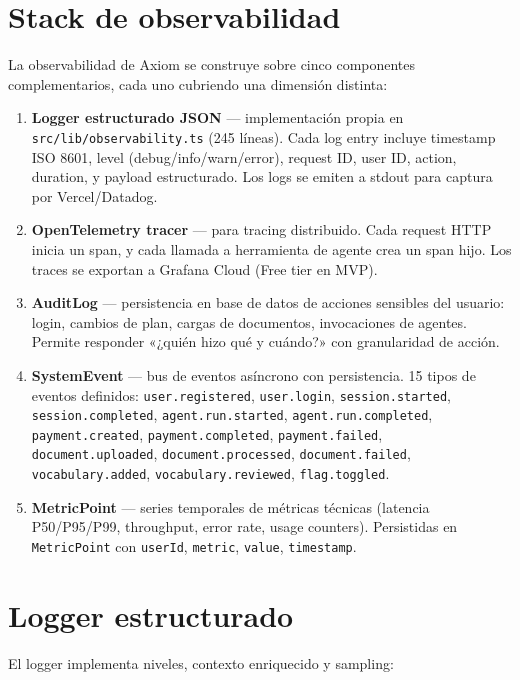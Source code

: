 \documentclass[10pt,a4paper,oneside]{report}
\begin{document}
\section{Stack de observabilidad}
La observabilidad de Axiom se construye sobre cinco componentes complementarios, cada uno cubriendo una dimensión distinta:

\begin{enumerate}[leftmargin=1.6em]
\item \textbf{Logger estructurado JSON} — implementación propia en \texttt{src/lib/observability.ts} (245 líneas). Cada log entry incluye timestamp ISO 8601, level (debug/info/warn/error), request ID, user ID, action, duration, y payload estructurado. Los logs se emiten a stdout para captura por Vercel/Datadog.
\item \textbf{OpenTelemetry tracer} — para tracing distribuido. Cada request HTTP inicia un span, y cada llamada a herramienta de agente crea un span hijo. Los traces se exportan a Grafana Cloud (Free tier en MVP).
\item \textbf{AuditLog} — persistencia en base de datos de acciones sensibles del usuario: login, cambios de plan, cargas de documentos, invocaciones de agentes. Permite responder «¿quién hizo qué y cuándo?» con granularidad de acción.
\item \textbf{SystemEvent} — bus de eventos asíncrono con persistencia. 15 tipos de eventos definidos: \texttt{user.registered}, \texttt{user.login}, \texttt{session.started}, \texttt{session.completed}, \texttt{agent.run.started}, \texttt{agent.run.completed}, \texttt{payment.created}, \texttt{payment.completed}, \texttt{payment.failed}, \texttt{document.uploaded}, \texttt{document.processed}, \texttt{document.failed}, \texttt{vocabulary.added}, \texttt{vocabulary.reviewed}, \texttt{flag.toggled}.
\item \textbf{MetricPoint} — series temporales de métricas técnicas (latencia P50/P95/P99, throughput, error rate, usage counters). Persistidas en \texttt{MetricPoint} con \texttt{userId}, \texttt{metric}, \texttt{value}, \texttt{timestamp}.
\end{enumerate}

\section{Logger estructurado}
El logger implementa niveles, contexto enriquecido y sampling:
\end{document}
